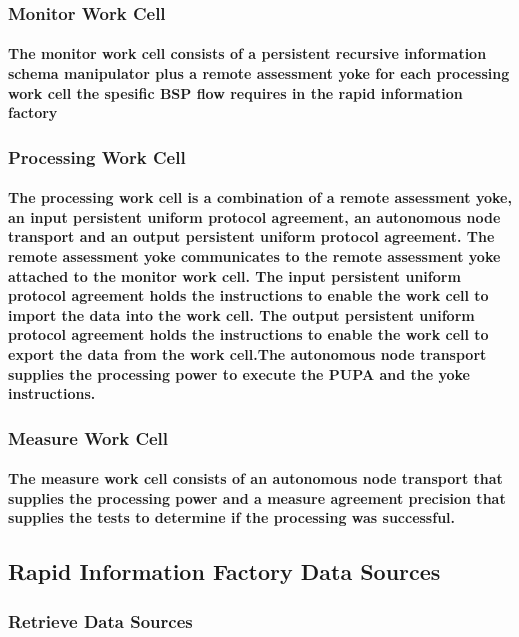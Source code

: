 \documentclass{acm_proc_article-sp}
\begin{document}
\subsubsection{Monitor Work Cell}
\paragraph{The monitor work cell consists of a persistent recursive information schema manipulator plus a remote assessment yoke for each processing work cell the spesific BSP flow requires in the rapid information factory}
\subsubsection{Processing Work Cell}
\paragraph{The processing work cell is a combination of a remote assessment yoke, an input persistent uniform protocol agreement, an autonomous node transport and an output persistent uniform protocol agreement. The remote assessment yoke communicates to the remote assessment yoke attached to the monitor work cell. The input persistent uniform protocol agreement holds the instructions to enable the work cell to import the data into the work cell. The output persistent uniform protocol agreement holds the instructions to enable the work cell to export the data from the work cell.The autonomous node transport supplies the processing power to execute the PUPA and the yoke instructions.}
\subsubsection{Measure Work Cell}
\paragraph{The measure work cell consists of an autonomous node transport that supplies the processing power and a measure agreement precision that supplies the tests to determine if the processing was successful.}

\newpage
\subsection{Rapid Information Factory Data Sources}
\subsubsection{Retrieve Data Sources}
\end{document}
